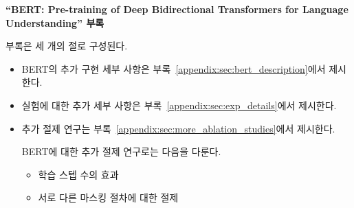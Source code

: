 \begin{center}
{\bf \large{
    ``BERT: Pre-training of Deep Bidirectional Transformers for Language Understanding'' 부록}}
\end{center}


부록은 세 개의 절로 구성된다.
\begin{itemize}
   \item BERT의 추가 구현 세부 사항은 부록~\ref{appendix:sec:bert_description}에서 제시한다.

   \item 실험에 대한 추가 세부 사항은 부록~\ref{appendix:sec:exp_details}에서 제시한다.


   \item 추가 절제 연구는 부록~\ref{appendix:sec:more_ablation_studies}에서 제시한다.

   BERT에 대한 추가 절제 연구로는 다음을 다룬다.
   \begin{itemize}
      \item 학습 스텝 수의 효과
      \item 서로 다른 마스킹 절차에 대한 절제
   \end{itemize}
\end{itemize}





